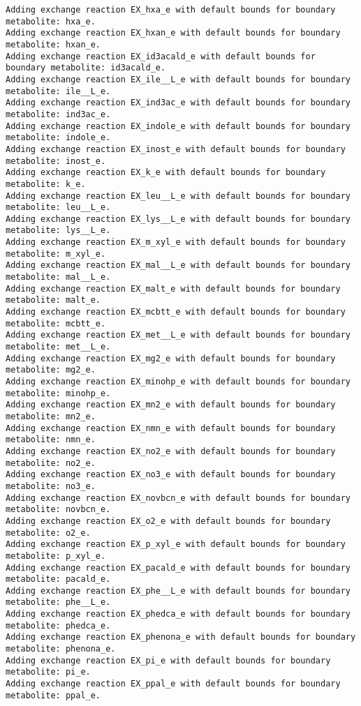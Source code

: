 \documentclass[
  letterpaper,
  DIV=11,
  numbers=noendperiod]{scrartcl}
\begin{document}
\begin{verbatim}
Adding exchange reaction EX_hxa_e with default bounds for boundary metabolite: hxa_e.
Adding exchange reaction EX_hxan_e with default bounds for boundary metabolite: hxan_e.
Adding exchange reaction EX_id3acald_e with default bounds for boundary metabolite: id3acald_e.
Adding exchange reaction EX_ile__L_e with default bounds for boundary metabolite: ile__L_e.
Adding exchange reaction EX_ind3ac_e with default bounds for boundary metabolite: ind3ac_e.
Adding exchange reaction EX_indole_e with default bounds for boundary metabolite: indole_e.
Adding exchange reaction EX_inost_e with default bounds for boundary metabolite: inost_e.
Adding exchange reaction EX_k_e with default bounds for boundary metabolite: k_e.
Adding exchange reaction EX_leu__L_e with default bounds for boundary metabolite: leu__L_e.
Adding exchange reaction EX_lys__L_e with default bounds for boundary metabolite: lys__L_e.
Adding exchange reaction EX_m_xyl_e with default bounds for boundary metabolite: m_xyl_e.
Adding exchange reaction EX_mal__L_e with default bounds for boundary metabolite: mal__L_e.
Adding exchange reaction EX_malt_e with default bounds for boundary metabolite: malt_e.
Adding exchange reaction EX_mcbtt_e with default bounds for boundary metabolite: mcbtt_e.
Adding exchange reaction EX_met__L_e with default bounds for boundary metabolite: met__L_e.
Adding exchange reaction EX_mg2_e with default bounds for boundary metabolite: mg2_e.
Adding exchange reaction EX_minohp_e with default bounds for boundary metabolite: minohp_e.
Adding exchange reaction EX_mn2_e with default bounds for boundary metabolite: mn2_e.
Adding exchange reaction EX_nmn_e with default bounds for boundary metabolite: nmn_e.
Adding exchange reaction EX_no2_e with default bounds for boundary metabolite: no2_e.
Adding exchange reaction EX_no3_e with default bounds for boundary metabolite: no3_e.
Adding exchange reaction EX_novbcn_e with default bounds for boundary metabolite: novbcn_e.
Adding exchange reaction EX_o2_e with default bounds for boundary metabolite: o2_e.
Adding exchange reaction EX_p_xyl_e with default bounds for boundary metabolite: p_xyl_e.
Adding exchange reaction EX_pacald_e with default bounds for boundary metabolite: pacald_e.
Adding exchange reaction EX_phe__L_e with default bounds for boundary metabolite: phe__L_e.
Adding exchange reaction EX_phedca_e with default bounds for boundary metabolite: phedca_e.
Adding exchange reaction EX_phenona_e with default bounds for boundary metabolite: phenona_e.
Adding exchange reaction EX_pi_e with default bounds for boundary metabolite: pi_e.
Adding exchange reaction EX_ppal_e with default bounds for boundary metabolite: ppal_e.

\end{verbatim}
\end{document}
